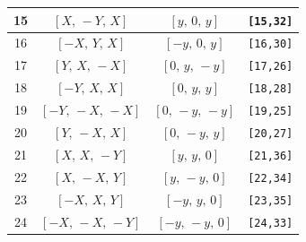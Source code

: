 \documentclass[fleqn,8pt]{jsarticle}
\begin{document}
\begin{longtable}{cccc}
15 & $\left[ X,\, - Y,\, X \right]$ & $\left[ y,\, 0,\, y \right]$ & {\tt [15,32]} \\ \hline
16 & $\left[ - X,\, Y,\, X \right]$ & $\left[ - y,\, 0,\, y \right]$ & {\tt [16,30]} \\ \hline
17 & $\left[ Y,\, X,\, - X \right]$ & $\left[ 0,\, y,\, - y \right]$ & {\tt [17,26]} \\ \hline
18 & $\left[ - Y,\, X,\, X \right]$ & $\left[ 0,\, y,\, y \right]$ & {\tt [18,28]} \\ \hline
19 & $\left[ - Y,\, - X,\, - X \right]$ & $\left[ 0,\, - y,\, - y \right]$ & {\tt [19,25]} \\ \hline
20 & $\left[ Y,\, - X,\, X \right]$ & $\left[ 0,\, - y,\, y \right]$ & {\tt [20,27]} \\ \hline
21 & $\left[ X,\, X,\, - Y \right]$ & $\left[ y,\, y,\, 0 \right]$ & {\tt [21,36]} \\ \hline
22 & $\left[ X,\, - X,\, Y \right]$ & $\left[ y,\, - y,\, 0 \right]$ & {\tt [22,34]} \\ \hline
23 & $\left[ - X,\, X,\, Y \right]$ & $\left[ - y,\, y,\, 0 \right]$ & {\tt [23,35]} \\ \hline
24 & $\left[ - X,\, - X,\, - Y \right]$ & $\left[ - y,\, - y,\, 0 \right]$ & {\tt [24,33]} \\
\end{longtable}
\renewcommand{\arraystretch}{1.2}
\end{document}
